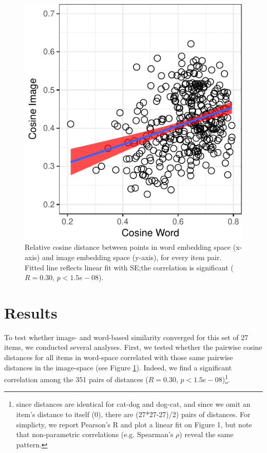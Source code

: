 \documentclass[10pt, letterpaper]{article}
\newenvironment{CodeChunk}{}{}
\begin{document}
\begin{CodeChunk}
\begin{figure}[tb]
\includegraphics{figs/pairwise-corr-1} \caption[Relative cosine distance between points in word embedding space (x-axis) and image embedding space (y-axis), for every item pair]{Relative cosine distance between points in word embedding space (x-axis) and image embedding space (y-axis), for every item pair. Fitted line reflects linear fit with SE;the correlation is significant ($R = 0.30$, $p < 1.5e-08$).}\label{fig:pairwise-corr}
\end{figure}
\end{CodeChunk}

\section{Results}\label{results}

To test whether image- and word-based similarity converged for this set
of 27 items, we conducted several analyses. First, we tested whether the
pairwise cosine distances for all items in word-space correlated with
those same pairwise distances in the image-space (see Figure
\ref{fig:pairwise-corr}). Indeed, we find a significant correlation
among the 351 pairs of distances (\(R = 0.30\),
\(p < 1.5e-08\))\footnote{since distances are identical for cat-dog and dog-cat, and since we omit an item's distance to itself (0), there are (27*27-27)/2) pairs of distances. For simplicty, we report Pearson's R and plot a linear fit on Figure 1, but note that non-parametric correlations (e.g. Spearman's $\rho$) reveal the same pattern.}.
\end{document}
